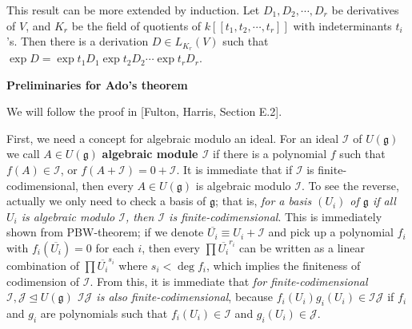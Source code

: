 \documentclass{article}
\newcommand{\lie}[1]{\mathfrak{#1}}
\begin{document}
This result can be more extended by induction.
Let $D_1, D_2, \cdots, D_r$ be derivatives of $V$, and $K_r$ be the field of quotients of $k[[t_1, t_2, \cdots, t_r]]$ with indeterminants $t_i$'s.
Then there is a derivation $D \in L_{K_r}(V)$ such that $\exp{D} = \exp{t_1 D_1} \exp{t_2 D_2} \cdots \exp{t_r D_r}$.

\newpage

\textbf{Preliminaries for Ado's theorem}

We will follow the proof in [Fulton, Harris, Section E.2].

First, we need a concept for algebraic modulo an ideal.
For an ideal $\mathcal{I}$ of $U(\lie{g})$ we call $A \in U(\lie{g})$ \textbf{algebraic module $\mathcal{I}$} if there is a polynomial $f$ such that $f(A) \in \mathcal{I}$, or $f(A + \mathcal{I}) = 0 + \mathcal{I}$.
It is immediate that if $\mathcal{I}$ is finite-codimensional, then every $A \in U(\lie{g})$ is algebraic modulo $\mathcal{I}$.
To see the reverse, actually we only need to check a basis of $\lie{g}$; that is, \textit{for a basis $(U_i)$ of $\lie{g}$ if all $U_i$ is algebraic modulo $\mathcal{I}$, then $\mathcal{I}$ is finite-codimensional}.
This is immediately shown from PBW-theorem; if we denote $\overline{U_i} \equiv U_i + \mathcal{I}$ and pick up a polynomial $f_i$ with $f_i(\overline{U_i}) = 0$ for each $i$, then every $\prod \overline{U_i}^{r_i}$ can be written as a linear combination of $\prod \overline{U_i}^{s_i}$ where $s_i < \deg{f_i}$, which implies the finiteness of codimension of $\mathcal{I}$.
From this, it is immediate that \textit{for finite-codimensional $\mathcal{I}, \mathcal{J} \trianglelefteq U(\lie{g})$ $\mathcal{I} \mathcal{J}$ is also finite-codimensional}, because $f_i(U_i) g_i(U_i) \in \mathcal{I} \mathcal{J}$ if $f_i$ and $g_i$ are polynomials such that $f_i(U_i) \in \mathcal{I}$ and $g_i(U_i) \in \mathcal{J}$.
\end{document}
